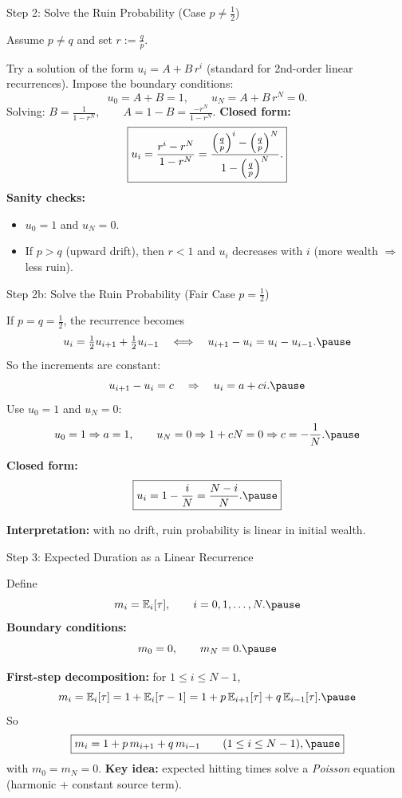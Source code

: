 \documentclass[aspectratio=169]{beamer}
\begin{document}
\begin{frame}{Step 2: Solve the Ruin Probability (Case $p\neq \tfrac12$)}

Assume $p\neq q$ and set $r:=\frac{q}{p}$.\pause

Try a solution of the form $u_i=A+B\,r^i$ (standard for 2nd-order linear recurrences).\pause
Impose the boundary conditions:
\[
u_0= A+B=1,
\qquad
u_N= A+B\,r^N=0.
\]
Solving:
$
B=\frac{1}{1-r^N},
\qquad
A=1-B=\frac{-r^N}{1-r^N}.
$
\pause
\textbf{Closed form:}
\[
\boxed{
u_i
=
\frac{r^i-r^N}{1-r^N}
=
\frac{\left(\frac{q}{p}\right)^i-\left(\frac{q}{p}\right)^N}{1-\left(\frac{q}{p}\right)^N}.
}
\vspace{-7mm}
\]
\pause
\textbf{Sanity checks:}
\begin{itemize}
  \item $u_0=1$ and $u_N=0$.
  \item If $p>q$ (upward drift), then $r<1$ and $u_i$ decreases with $i$ (more wealth $\Rightarrow$ less ruin).
\end{itemize}

\end{frame}

\begin{frame}{Step 2b: Solve the Ruin Probability (Fair Case $p=\tfrac12$)}

If $p=q=\tfrac12$, the recurrence becomes
\[
u_i=\tfrac12 u_{i+1}+\tfrac12 u_{i-1}
\quad\Longleftrightarrow\quad
u_{i+1}-u_i = u_i-u_{i-1}.\pause
\]
So the increments are constant:
\[
u_{i+1}-u_i = c \quad\Rightarrow\quad u_i = a+ci.\pause
\]
Use $u_0=1$ and $u_N=0$:
\[
u_0=1 \Rightarrow a=1,
\qquad
u_N=0 \Rightarrow 1+cN=0 \Rightarrow c=-\frac{1}{N}.\pause
\]

\medskip
\textbf{Closed form:}
\[
\boxed{
u_i=1-\frac{i}{N}=\frac{N-i}{N}.\pause
}
\]

\medskip
\textbf{Interpretation:} with no drift, ruin probability is linear in initial wealth.

\end{frame}

\begin{frame}{Step 3: Expected Duration as a Linear Recurrence}

Define
\[
m_i=\mathbb{E}_i[\tau],\qquad i=0,1,\dots,N.\pause
\]
\textbf{Boundary conditions:}
\[
m_0=0,\qquad m_N=0.\pause
\]

\medskip
\textbf{First-step decomposition:} for $1\le i\le N-1$,
\[
m_i=\mathbb{E}_i[\tau]
=
1+\mathbb{E}_i[\tau-1]
=
1+p\,\mathbb{E}_{i+1}[\tau]+q\,\mathbb{E}_{i-1}[\tau].\pause
\]
So
\[
\boxed{
m_i = 1+p\,m_{i+1}+q\,m_{i-1}
\qquad (1\le i\le N-1),\pause
}
\]
with $m_0=m_N=0$.
\pause
\medskip
\textbf{Key idea:} expected hitting times solve a \emph{Poisson} equation (harmonic + constant source term).

\end{frame}
\end{document}
